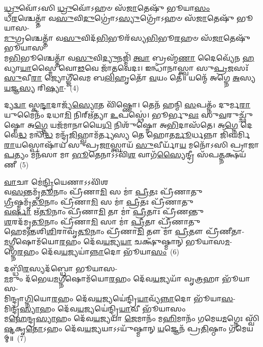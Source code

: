 \-\ul{𑌧𑍍𑌰𑍁}\-𑌵𑍋᳴\-𑌽𑌸𑌿 \ul{𑌧𑍍𑌰𑍁}\-𑌵𑍋᳴\-𑌽𑌹𑍞 𑌸᳴\-\ul{𑌜𑌾}\-𑌤𑍇𑌷𑍁᳴ 𑌭𑍂𑌯𑌾\-\ul{𑌸𑌂}\-\\
𑌧𑍀\-\ul{𑌰}\-𑌶𑍍𑌚𑍇𑌤𑍍𑌤𑌾᳴ 𑌵\-\ul{𑌸𑍁}\-𑌵𑌿\-\ul{𑌦𑍁}\-𑌗𑍍𑌰𑍋॑\-𑌽\-\ul{𑌸𑍍𑌯𑍁}\-𑌗𑍍𑌰𑍋᳴\-𑌽𑌹𑍞 𑌸᳴\-\ul{𑌜𑌾}\-𑌤𑍇𑌷𑍁᳴ 𑌭𑍂𑌯𑌾𑌸-\\
\-\ul{𑌮𑍁}\-𑌗𑍍𑌰𑌶𑍍𑌚𑍇𑌤𑍍𑌤𑌾᳴ 𑌵\-\ul{𑌸𑍁}\-𑌵𑌿𑌦᳴\-\ul{𑌭𑌿}\-𑌭𑍂𑌰᳴𑌸𑍍𑌯\-\ul{𑌭𑌿}\-𑌭𑍂\-\ul{𑌰}\-𑌹𑍞 𑌸᳴\-\ul{𑌜𑌾}\-𑌤𑍇𑌷𑍁᳴ 𑌭𑍂𑌯𑌾𑌸-\\
𑌮\-\ul{𑌭𑌿}\-𑌭𑍂𑌶𑍍𑌚𑍇𑌤𑍍𑌤𑌾᳴ 𑌵\-\ul{𑌸𑍁}\-𑌵𑌿\-\ul{𑌦𑍍𑌯𑍁}\-𑌨𑌜𑍍𑌮𑌿᳴ \ul{𑌤𑍍𑌵𑌾} 𑌬𑍍𑌰𑌹𑍍𑌮᳴\-\ul{𑌣𑌾} 𑌦𑍈𑌵𑍍𑌯𑍇᳴𑌨 \ul{𑌹}\-𑌵𑍍𑌯𑌾\-\ul{𑌯𑌾}\-𑌸𑍍𑌮𑍈 𑌵𑍋\-\ul{𑌢}\-𑌵𑍇 𑌜𑌾᳴𑌤𑌵𑍇𑌦𑌃। 𑌇𑌨𑍍𑌧𑌾᳴𑌨𑌾𑌸𑍍𑌤𑍍𑌵𑌾 𑌸𑍁\-\ul{𑌪𑍍𑌰}\-𑌜𑌸𑌃᳴ \ul{𑌸𑍁}\-𑌵𑍀\-\ul{𑌰𑌾} 𑌜𑍍𑌯𑍋𑌗𑍍𑌜𑍀᳴𑌵𑍇𑌮 𑌬\-\ul{𑌲𑌿}\-𑌹𑍃𑌤𑍋᳴ \ul{𑌵}\-𑌯𑌂 𑌤𑍇॑॥ 𑌯𑌨𑍍𑌮𑍇᳴ 𑌅𑌗𑍍𑌨𑍇 \ul{𑌅}\-𑌸𑍍𑌯 \ul{𑌯}\-𑌜𑍍𑌞\-\ul{𑌸𑍍𑌯} 𑌰𑌿\-\ul{𑌷𑍍𑌯𑌾}\--~(4)

𑌦𑍍𑌯\-\ul{𑌦𑍍𑌵𑌾} 𑌸𑍍𑌕\-\ul{𑌨𑍍𑌦𑌾}\-𑌦𑌾𑌜𑍍𑌯᳴\-\ul{𑌸𑍍𑌯𑍋}\-𑌤 𑌵𑌿᳴𑌷𑍍𑌣𑍋। 𑌤𑍇𑌨᳴ 𑌹𑌨𑍍𑌮𑌿 \ul{𑌸}\-𑌪𑌤𑍍𑌨𑌂᳴ 𑌦𑍁𑌰𑍍𑌮\-\ul{𑌰𑌾}\-𑌯𑍁𑌮𑍈𑌨𑌂᳴ 𑌦𑌧𑌾\-\ul{𑌮𑌿} 𑌨𑌿𑌰𑍍\mbox{}𑌋᳴𑌤𑍍𑌯𑌾 \ul{𑌉}\-𑌪𑌸𑍍𑌥𑍇॑। 𑌭𑍂𑌰𑍍𑌭𑍁\-\ul{𑌵𑌃} 𑌸𑍁\-\ul{𑌵}\-𑌰𑍁𑌚𑍍𑌛𑍁᳴𑌷𑍍𑌮𑍋 𑌅\-\ul{𑌗𑍍𑌨𑍇} 𑌯𑌜᳴𑌮𑌾𑌨𑌾𑌯𑍈\-\ul{𑌧𑌿} 𑌨𑌿𑌶𑍁᳴𑌷𑍍𑌮𑍋 𑌅\-\ul{𑌭𑌿}\-𑌦𑌾𑌸᳴𑌤𑍇। 𑌅\-\ul{𑌗𑍍𑌨𑍇} 𑌦𑍇𑌵𑍇॑\-\ul{𑌦𑍍𑌧} 𑌮𑌨𑍍𑌵𑌿᳴\-\ul{𑌦𑍍𑌧} 𑌮𑌨𑍍𑌦𑍍𑌰᳴\-\ul{𑌜𑌿}\-𑌹𑍍𑌵𑌾𑌮᳴𑌰𑍍𑌤𑍍𑌯𑌸𑍍𑌯 𑌤𑍇 𑌹𑍋𑌤\-\ul{𑌰𑍍𑌮𑍂}\-𑌰𑍍𑌧𑌨𑍍𑌨𑌾 𑌜𑌿᳴𑌘𑌰𑍍𑌮𑌿 \ul{𑌰𑌾}\-𑌯𑌸𑍍𑌪𑍋𑌷𑌾᳴𑌯 𑌸𑍁𑌪𑍍𑌰\-\ul{𑌜𑌾}\-𑌸𑍍𑌤𑍍𑌵𑌾𑌯᳴ \ul{𑌸𑍁}\-𑌵𑍀𑌰𑍍𑌯𑌾᳴\-\ul{𑌯} 𑌮𑌨𑍋᳴\-𑌽𑌸𑌿 𑌪𑍍𑌰𑌾𑌜𑌾\-\ul{𑌪}\-𑌤𑍍𑌯𑌂 𑌮𑌨᳴𑌸𑌾 𑌮𑌾 \ul{𑌭𑍂}\-𑌤𑍇𑌨𑌾\-𑌽\-𑌽𑌵𑌿᳴\-\ul{𑌶} 𑌵𑌾𑌗᳴\-\ul{𑌸𑍍𑌯𑍈}\-𑌨𑍍𑌦𑍍𑌰𑍀 𑌸᳴𑌪\-\ul{𑌤𑍍𑌨}\-𑌕𑍍𑌷𑌯᳴𑌣𑍀~(5)

\-\ul{𑌵𑌾}\-𑌚𑌾 𑌮𑍇॑\-\ul{𑌨𑍍𑌦𑍍𑌰𑌿}\-𑌯𑍇𑌣𑌾\-𑌽\-𑌽𑌵𑌿᳴𑌶\\
𑌵\-\ul{𑌸}\-𑌨𑍍𑌤𑌮𑍃᳴\-\ul{𑌤𑍂}\-𑌨𑌾𑌂 𑌪𑍍𑌰𑍀᳴𑌣𑌾\-\ul{𑌮𑌿} 𑌸 𑌮𑌾॑ \ul{𑌪𑍍𑌰𑍀}\-𑌤𑌃 𑌪𑍍𑌰𑍀᳴𑌣𑌾𑌤𑍁\\
\-\ul{𑌗𑍍𑌰𑍀}\-𑌷𑍍𑌮𑌮𑍃᳴\-\ul{𑌤𑍂}\-𑌨𑌾𑌂 𑌪𑍍𑌰𑍀᳴𑌣𑌾\-\ul{𑌮𑌿} 𑌸 𑌮𑌾॑ \ul{𑌪𑍍𑌰𑍀}\-𑌤𑌃 𑌪𑍍𑌰𑍀᳴𑌣𑌾𑌤𑍁\\
\-\ul{𑌵}\-\-\ul{𑌰𑍍}\-\mbox{}𑌷𑌾 𑌋᳴\-\ul{𑌤𑍂}\-𑌨𑌾𑌂 𑌪𑍍𑌰𑍀᳴𑌣𑌾\-\ul{𑌮𑌿} 𑌤𑌾 𑌮𑌾॑ \ul{𑌪𑍍𑌰𑍀}\-𑌤𑌾𑌃 𑌪𑍍𑌰𑍀᳴𑌣𑌨𑍍𑌤𑍁\\
\-\ul{𑌶}\-𑌰𑌦᳴𑌮𑍃\-\ul{𑌤𑍂}\-𑌨𑌾𑌂 𑌪𑍍𑌰𑍀᳴𑌣𑌾\-\ul{𑌮𑌿} 𑌸𑌾 𑌮𑌾॑ \ul{𑌪𑍍𑌰𑍀}\-𑌤𑌾 𑌪𑍍𑌰𑍀᳴𑌣𑌾𑌤𑍁\\
𑌹𑍇𑌮𑌨𑍍𑌤𑌶𑌿\-\ul{𑌶𑌿}\-𑌰𑌾𑌵𑍃᳴\-\ul{𑌤𑍂}\-𑌨𑌾𑌂 𑌪𑍍𑌰𑍀᳴𑌣𑌾\-\ul{𑌮𑌿} 𑌤𑍗 𑌮𑌾॑ \ul{𑌪𑍍𑌰𑍀}\-𑌤𑍗 𑌪𑍍𑌰𑍀᳴𑌣𑍀𑌤𑌾-\\
\-\ul{𑌮}\-𑌗𑍍𑌨𑍀𑌷𑍋𑌮᳴𑌯𑍋\-\ul{𑌰}\-𑌹𑌂 𑌦𑍇᳴𑌵\-\ul{𑌯}\-𑌜𑍍𑌯\-\ul{𑌯𑌾} 𑌚𑌕𑍍𑌷𑍁᳴𑌷𑍍𑌮𑌾𑌨𑍍 𑌭𑍂𑌯𑌾𑌸\-\ul{𑌮}\--\\
𑌗𑍍𑌨𑍇\-\ul{𑌰}\-𑌹𑌂 𑌦𑍇᳴𑌵\-\ul{𑌯}\-𑌜𑍍𑌯𑌯𑌾॑\-\ul{𑌨𑍍𑌨𑌾}\-𑌦𑍋 𑌭𑍂᳴𑌯𑌾\-\ul{𑌸𑌂}\-~(6)

𑌦𑌬𑍍𑌧𑌿᳴\-\ul{𑌰}\-𑌸𑍍𑌯𑌦᳴𑌬𑍍𑌧𑍋 𑌭𑍂𑌯𑌾𑌸-\\
\-\ul{𑌮}\-𑌮𑍁𑌂 𑌦᳴𑌭𑍇𑌯\-\ul{𑌮}\-𑌗𑍍𑌨𑍀𑌷𑍋𑌮᳴𑌯𑍋\-\ul{𑌰}\-𑌹𑌂 𑌦𑍇᳴𑌵\-\ul{𑌯}\-𑌜𑍍𑌯𑌯𑌾᳴ 𑌵𑍃\-\ul{𑌤𑍍𑌰}\-𑌹𑌾 𑌭𑍂᳴𑌯𑌾𑌸-\\
𑌮𑌿𑌨𑍍𑌦𑍍𑌰𑌾\-\ul{𑌗𑍍𑌨𑌿}\-𑌯𑍋\-\ul{𑌰}\-𑌹𑌂 𑌦𑍇᳴𑌵\-\ul{𑌯}\-𑌜𑍍𑌯𑌯𑍇॑𑌨𑍍𑌦𑍍𑌰𑌿\-\ul{𑌯𑌾}\-\-𑌵𑍍𑌯᳴\-\ul{𑌨𑍍𑌨𑌾}\-𑌦𑍋 𑌭𑍂᳴𑌯𑌾\-\ul{𑌸}\--\\
𑌮𑌿𑌨𑍍𑌦𑍍𑌰᳴\-\ul{𑌸𑍍𑌯𑌾}\-𑌹𑌂 𑌦𑍇᳴𑌵\-\ul{𑌯}\-𑌜𑍍𑌯𑌯𑍇॑𑌨𑍍𑌦𑍍𑌰𑌿\-\ul{𑌯𑌾}\-𑌵𑍀 𑌭𑍂᳴𑌯𑌾𑌸𑌂\\
𑌮\-\ul{𑌹𑍇}\-𑌨𑍍𑌦𑍍𑌰\-\ul{𑌸𑍍𑌯𑌾}\-𑌹𑌂 𑌦𑍇᳴𑌵\-\ul{𑌯}\-𑌜𑍍𑌯𑌯𑌾᳴ \ul{𑌜𑍇}\-𑌮𑌾𑌨𑌂᳴ 𑌮\-\ul{𑌹𑌿}\-𑌮𑌾𑌨𑌂᳴ 𑌗𑌮𑍇𑌯\-\ul{𑌮}\-𑌗𑍍𑌨𑍇𑌃 𑌸𑍍𑌵𑌿᳴\-\ul{𑌷𑍍𑌟}\-𑌕𑍃\-\ul{𑌤𑍋}\-\-𑌽𑌹𑌂 𑌦𑍇᳴𑌵\-\ul{𑌯}\-𑌜𑍍𑌯𑌯𑌾\-𑌽\-𑌽𑌯𑍁᳴𑌷𑍍𑌮𑌾𑌨𑍍 \ul{𑌯}\-𑌜𑍍𑌞𑍇𑌨᳴ 𑌪𑍍𑌰\-\ul{𑌤𑌿}\-𑌷𑍍𑌠𑌾𑌂 𑌗᳴𑌮𑍇𑌯𑌮𑍍॥~(7)

